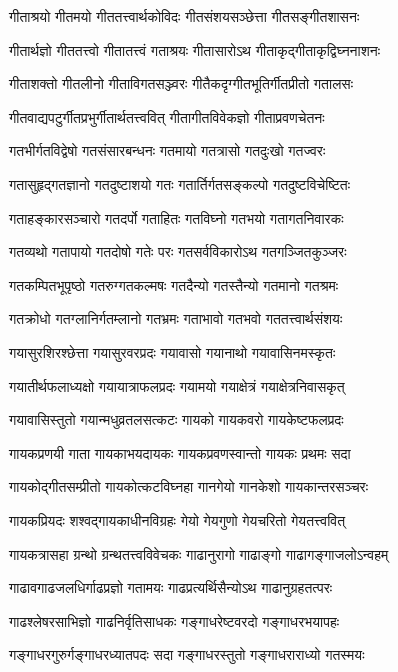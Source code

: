 \twolineshloka
{गीताश्रयो गीतमयो गीततत्त्वार्थकोविदः}%
{गीतसंशयसञ्छेत्ता गीतसङ्गीतशासनः}%

\twolineshloka
{गीतार्थज्ञो गीततत्त्वो गीतातत्त्वं गताश्रयः}%
{गीतासारोऽथ गीताकृद्गीताकृद्विघ्ननाशनः}%

\twolineshloka
{गीताशक्तो गीतलीनो गीताविगतसञ्ज्वरः}%
{गीतैकदृग्गीतभूतिर्गीतप्रीतो गतालसः}%

\twolineshloka
{गीतवाद्यपटुर्गीतप्रभुर्गीतार्थतत्त्ववित्}%
{गीतागीतविवेकज्ञो गीताप्रवणचेतनः}%

\twolineshloka
{गतभीर्गतविद्वेषो गतसंसारबन्धनः}%
{गतमायो गतत्रासो गतदुःखो गतज्वरः}%

\twolineshloka
{गतासुहृद्गतज्ञानो गतदुष्टाशयो गतः}%
{गतार्तिर्गतसङ्कल्पो गतदुष्टविचेष्टितः}%

\twolineshloka
{गताहङ्कारसञ्चारो गतदर्पो गताहितः}%
{गतविघ्नो गतभयो गतागतनिवारकः}%

\twolineshloka
{गतव्यथो गतापायो गतदोषो गतेः परः}%
{गतसर्वविकारोऽथ गतगञ्जितकुञ्जरः}%

\twolineshloka
{गतकम्पितभूपृष्ठो गतरुग्गतकल्मषः}%
{गतदैन्यो गतस्तैन्यो गतमानो गतश्रमः}%

\twolineshloka
{गतक्रोधो गतग्लानिर्गतम्लानो गतभ्रमः}%
{गताभावो गतभवो गततत्त्वार्थसंशयः}%

\twolineshloka
{गयासुरशिरश्छेत्ता गयासुरवरप्रदः}%
{गयावासो गयानाथो गयावासिनमस्कृतः}%

\twolineshloka
{गयातीर्थफलाध्यक्षो गयायात्राफलप्रदः}%
{गयामयो गयाक्षेत्रं गयाक्षेत्रनिवासकृत्}%

\twolineshloka
{गयावासिस्तुतो गयान्मधुव्रतलसत्कटः}%
{गायको गायकवरो गायकेष्टफलप्रदः}%

\twolineshloka
{गायकप्रणयी गाता गायकाभयदायकः}%
{गायकप्रवणस्वान्तो गायकः प्रथमः सदा}%

\twolineshloka
{गायकोद्गीतसम्प्रीतो गायकोत्कटविघ्नहा}%
{गानगेयो गानकेशो गायकान्तरसञ्चरः}%

\twolineshloka
{गायकप्रियदः शश्वद्गायकाधीनविग्रहः}%
{गेयो गेयगुणो गेयचरितो गेयतत्त्ववित्}%

\twolineshloka
{गायकत्रासहा ग्रन्थो ग्रन्थतत्त्वविवेचकः}%
{गाढानुरागो गाढाङ्गो गाढागङ्गाजलोऽन्वहम्}%

\twolineshloka
{गाढावगाढजलधिर्गाढप्रज्ञो गतामयः}%
{गाढप्रत्यर्थिसैन्योऽथ गाढानुग्रहतत्परः}%

\twolineshloka
{गाढश्लेषरसाभिज्ञो गाढनिर्वृतिसाधकः}%
{गङ्गाधरेष्टवरदो गङ्गाधरभयापहः}%

\twolineshloka
{गङ्गाधरगुरुर्गङ्गाधरध्यातपदः सदा}
{गङ्गाधरस्तुतो गङ्गाधराराध्यो गतस्मयः}%

